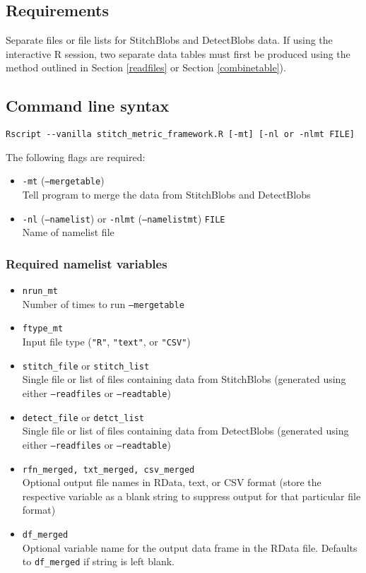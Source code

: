 \documentclass{article}
\begin{document}
\subsection{Requirements}
Separate files or file lists for StitchBlobs and DetectBlobs data. If using the interactive R session, two separate data tables must first be produced using the method outlined in Section \ref{readfiles} or Section \ref{combinetable}). 

\subsection{Command line syntax}
\begin{verbatim}
Rscript --vanilla stitch_metric_framework.R [-mt] [-nl or -nlmt FILE]
\end{verbatim}

The following flags are required:
\begin{itemize}
\item[] \texttt{-mt} (\texttt{--mergetable}) \\ Tell program to merge the data from StitchBlobs and DetectBlobs
\item[]\texttt{-nl} (\texttt{--namelist}) or \texttt{-nlmt} (\texttt{--namelistmt}) \texttt{FILE}\\ Name of namelist file
\end{itemize}

\subsubsection{Required namelist variables}

\begin{itemize}
\item[]\texttt{nrun\_mt}\\ Number of times to run \texttt{--mergetable}
\item[] \texttt{ftype\_mt}\\ Input file type (\texttt{"R"}, \texttt{"text"}, or \texttt{"CSV"})
\item[] \texttt{stitch\_file} or \texttt{stitch\_list}\\ Single file or list of files containing  data from StitchBlobs (generated using either \texttt{--readfiles} or \texttt{--readtable})
\item[] \texttt{detect\_file} or \texttt{detct\_list}\\ Single file or list of files containing  data from DetectBlobs (generated using either \texttt{--readfiles} or \texttt{--readtable})
\item[] \texttt{rfn\_merged, txt\_merged, csv\_merged}\\Optional output file names in RData, text, or CSV format (store the respective variable as a blank string to suppress output for that particular file format)
\item[] \texttt{df\_merged}\\Optional variable name for the output data frame in the RData file. Defaults to \texttt{df\_merged} if string is left blank.
\end{itemize}
\end{document}
